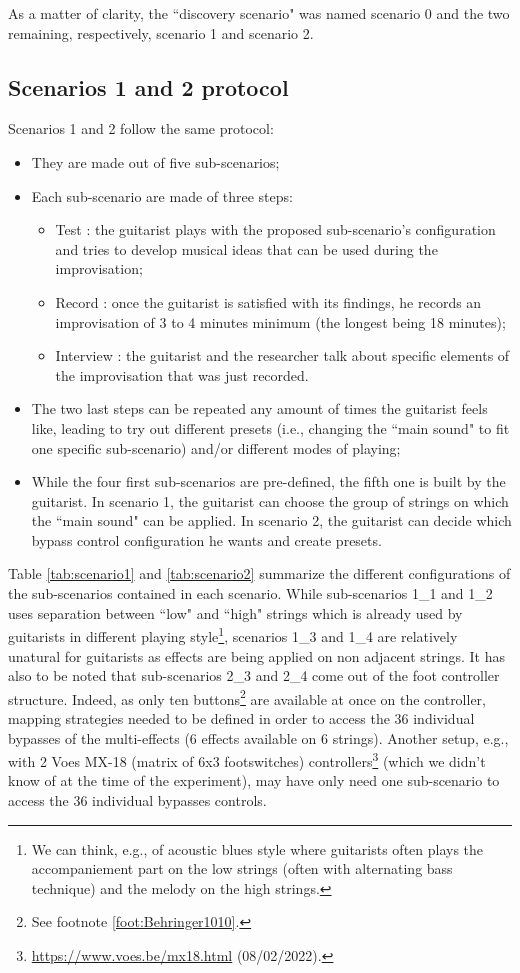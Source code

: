 \documentclass{article}
\begin{document}
As a matter of clarity, the ``discovery scenario" was named scenario 0 and the two remaining, respectively, scenario 1 and scenario 2.

\subsection{Scenarios 1 and 2 protocol}
Scenarios 1 and 2 follow the same protocol: 
\begin{itemize}
    \item They are made out of five sub-scenarios;
    \item Each sub-scenario are made of three steps: 
    \begin{itemize}
        \item Test : the guitarist plays with the proposed sub-scenario's configuration and tries to develop musical ideas that can be used during the improvisation;
        \item Record : once the guitarist is satisfied with its findings, he records an improvisation of 3 to 4 minutes minimum (the longest being 18 minutes);
        \item Interview : the guitarist and the researcher talk about specific elements of the improvisation that was just recorded.
    \end{itemize}
    \item The two last steps can be repeated any amount of times the guitarist feels like, leading to try out different presets (i.e., changing the ``main sound" to fit one specific sub-scenario) and/or different modes of playing;
    \item While the four first sub-scenarios are pre-defined, the fifth one is built by the guitarist. In scenario 1, the guitarist can choose the group of strings on which the ``main sound" can be applied. In scenario 2, the guitarist can decide which bypass control configuration he wants and create presets.
\end{itemize}

Table \ref{tab:scenario1} and \ref{tab:scenario2} summarize the different configurations of the sub-scenarios contained in each scenario.
While sub-scenarios 1\_1 and 1\_2 uses separation between ``low" and ``high" strings which is already used by guitarists in different playing style\footnote{We can think, e.g., of acoustic blues style where guitarists often plays the accompaniement part on the low strings (often with alternating bass technique) and the melody on the high strings.}, scenarios 1\_3 and 1\_4 are relatively unatural for guitarists as effects are being applied on non adjacent strings.
It has also to be noted that sub-scenarios 2\_3 and 2\_4 come out of the foot controller structure. Indeed, as only ten buttons\footnote{See footnote \ref{foot:Behringer1010}.} are available at once on the controller, mapping strategies needed to be defined in order to access the 36 individual bypasses of the multi-effects (6 effects available on 6 strings). Another setup, e.g., with 2 Voes MX-18 (matrix of 6x3 footswitches) controllers\footnote{\url{https://www.voes.be/mx18.html} (08/02/2022).} (which we didn't know of at the time of the experiment), may have only need one sub-scenario to access the 36 individual bypasses controls.
\end{document}
